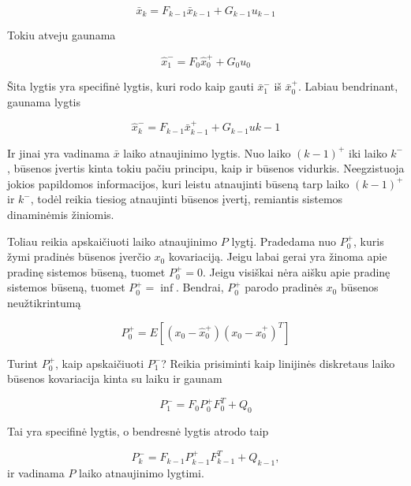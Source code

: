     \begin{equation}
        \bar{x}_k = F_{k-1}\bar{x}_{k-1} + G_{k-1}u_{k-1}
    \end{equation}

    Tokiu atveju gaunama

    \begin{equation}
        \hat{x}_1^- = F_0\hat{x}_0^+ + G_0u_0
    \end{equation}

    Šita lygtis yra specifinė lygtis, kuri rodo kaip gauti $\bar{x}_1^-$ iš $\bar{x}_0^+$. Labiau bendrinant, gaunama lygtis

    \begin{equation}
        \hat{x}_k^- = F_{k-1}\bar{x}_{k-1}^+ + G_{k-1}u{k-1}
    \end{equation}

    Ir jinai yra vadinama $\bar{x}$ laiko atnaujinimo lygtis.
    Nuo laiko $(k-1)^+$ iki laiko $k^-$, būsenos įvertis kinta tokiu pačiu principu, kaip ir būsenos vidurkis.
    Neegzistuoja jokios papildomos informacijos, kuri leistu atnaujinti būseną tarp laiko $(k-1)^+$ ir $k^-$, todėl reikia tiesiog atnaujinti būsenos įvertį, remiantis sistemos dinaminėmis žiniomis.

    Toliau reikia apskaičiuoti laiko atnaujinimo $P$ lygtį.
    Pradedama nuo $P_0^+$, kuris žymi pradinės būsenos įverčio $x_0$ kovariaciją.
    Jeigu labai gerai yra žinoma apie pradinę sistemos būseną, tuomet $P_0^+ = 0$.
    Jeigu visiškai nėra aišku apie pradinę sistemos būseną, tuomet $P_0^+ = \inf$.
    Bendrai, $P_0^+$ parodo pradinės $x_0$ būsenos neužtikrintumą

    \begin{equation}
        P_0^+ = E[(x_0 - \hat{x}_0^+)(x_0 - \hat{x}_0^+)^T]
    \end{equation}

    Turint $P_0^+$, kaip apskaičiuoti $P_1^-$? Reikia prisiminti kaip linijinės diskretaus laiko būsenos kovariacija kinta su laiku ir gaunam

    \begin{equation}
        P_1^- = F_0 P_0^+F_0^T + Q_0
    \end{equation}

    Tai yra specifinė lygtis, o bendresnė lygtis atrodo taip

    \begin{equation}
        P_k^- = F_{k-1}P_{k-1}^+F_{k-1}^T + Q_{k-1},
    \end{equation}
    ir vadinama $P$ laiko atnaujinimo lygtimi.

